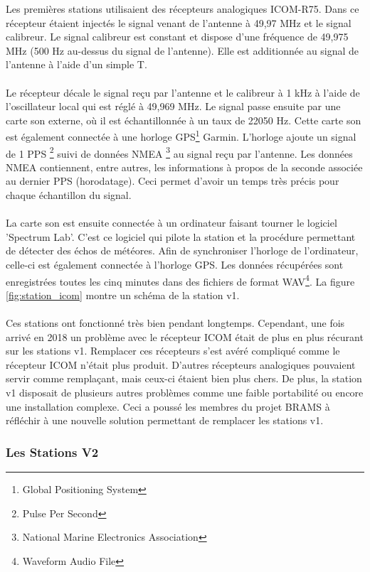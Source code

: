 \documentclass[11pt]{article}
\begin{document}
Les premières stations utilisaient des récepteurs analogiques ICOM-R75.
Dans ce récepteur étaient injectés le signal venant de l'antenne à 49,97 MHz et le signal calibreur.
Le signal calibreur est constant et dispose d'une fréquence de 49,975 MHz (500 Hz au-dessus du signal de l'antenne).
Elle est additionnée au signal de l'antenne à l'aide d'un simple T.\\
\\
Le récepteur décale le signal reçu par l'antenne et le calibreur à 1 kHz à l'aide de l'oscillateur local qui est réglé à 49,969 MHz.
Le signal passe ensuite par une carte son externe, où il est échantillonnée à un taux de 22050 Hz.
Cette carte son est également connectée à une horloge GPS\footnote{Global Positioning System} Garmin.
L'horloge ajoute un signal de 1 PPS \footnote{Pulse Per Second} suivi de données NMEA \footnote{National Marine Electronics Association} au signal reçu par l'antenne.
Les données NMEA contiennent, entre autres, les informations à propos de la seconde associée au dernier PPS (horodatage).
Ceci permet d'avoir un temps très précis pour chaque échantillon du signal.\\
\\
La carte son est ensuite connectée à un ordinateur faisant tourner le logiciel 'Spectrum Lab'.
C'est ce logiciel qui pilote la station et la procédure permettant de détecter des échos de météores.
Afin de synchroniser l'horloge de l'ordinateur, celle-ci est également connectée à l'horloge GPS.
Les données récupérées sont enregistrées toutes les cinq minutes dans des fichiers de format WAV\footnote{Waveform Audio File}.
La figure \ref{fig:station_icom} montre un schéma de la station v1.\\
\\
Ces stations ont fonctionné très bien pendant longtemps.
Cependant, une fois arrivé en 2018 un problème avec le récepteur ICOM était de plus en plus récurant sur les stations v1.
Remplacer ces récepteurs s'est avéré compliqué comme le récepteur ICOM n'était plus produit.
D'autres récepteurs analogiques pouvaient servir comme remplaçant, mais ceux-ci étaient bien plus chers.
De plus, la station v1 disposait de plusieurs autres problèmes comme une faible portabilité ou encore une installation complexe.
Ceci a poussé les membres du projet BRAMS à réfléchir à une nouvelle solution permettant de remplacer les stations v1.

\subsubsection{Les Stations V2}
\end{document}
